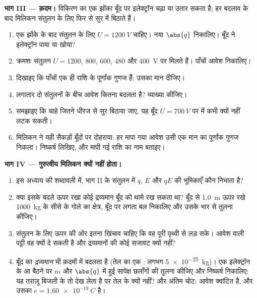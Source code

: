 \begin{problem}
\medskip
\noindent\textbf{भाग III --- क़दम।}
विकिरण का एक झोंका बूँद पर इलेक्ट्रॉन चढ़ा या उतार सकता है; हर बदलाव के बाद
मिलिकन संतुलन के लिए  फिर से सुर में बिठाते हैं।
\begin{enumerate}[resume]
  \item एक झोंके के बाद संतुलन के लिए $U = \qty{1200}{V}$ चाहिए। नया $\abs{q}$ निकालिए।
        बूँद ने इलेक्ट्रॉन पाया या खोया?
  \item क्रमशः संतुलन $U = 1200$, $800$, $600$, $480$ और \qty{400}{V} पर मिलते
        हैं। पाँचों आवेश निकालिए।
  \item दिखाइए कि पाँचों एक ही राशि के पूर्णांक गुणज हैं; उसका मान दीजिए।
  \item लगातार दो संतुलनों के बीच आवेश कितना बदलता है? व्याख्या कीजिए।
  \item समझाइए कि चाहे जितने धीरज से सुर बिठाया जाए, यह बूँद $U = \qty{700}{V}$ पर
         में कभी क्यों नहीं लटक सकती।
  \item मिलिकन ने यही सैकड़ों बूँदों पर दोहराया: हर मापा गया आवेश उसी एक मान
        का पूर्णांक गुणज निकला। निष्कर्ष लिखिए, और मापी गई राशि का नाम
        बताइए।
\end{enumerate}

\medskip
\noindent\textbf{भाग IV --- गुरुत्वीय मिलिकन क्यों नहीं होता।}
\begin{enumerate}[resume]
  \item इस अध्याय की शब्दावली में, भाग II के संतुलन में $q$, $E$ और
        $qE$ की भूमिकाएँ कौन निभाता है?
  \item क्या इसके बदले ऊपर रखा कोई द्रव्यमान बूँद को थामे रख सकता था? बूँद
        से \qty{1.0}{m} ऊपर रखे \qty{1000}{kg} के सीसे के गोले का क्षेत्र,
        बूँद पर लगता बल निकालिए और उसके भार से तुलना
        कीजिए।
  \item संतुलन के लिए ऊपर की ओर इतना खिंचाव चाहिए कि वह पूरी पृथ्वी से लड़
        सके। आवेश वाली पट्टी वह क्यों दे सकती है और द्रव्यमानों की कोई सजावट
        क्यों नहीं?
  \item बूँद का \emph{द्रव्यमान} भी क़दमों में बदलता है (तेल का एक
        : लगभग \qty{5e-25}{kg})। एक इलेक्ट्रॉन के आ बैठने पर $m$ और
        $\abs{q}$ में हुई सापेक्ष छलाँगों की तुलना कीजिए और निष्कर्ष निकालिए:
        यह तराज़ू बिजली के  तो देख लेता है पर तेल के
         क्यों नहीं? और अंतिम चोट: आवेश क्वांटित है, और उसका
         $e = \qty{1.60e-19}{C}$ है।
\end{enumerate}
\end{problem}

